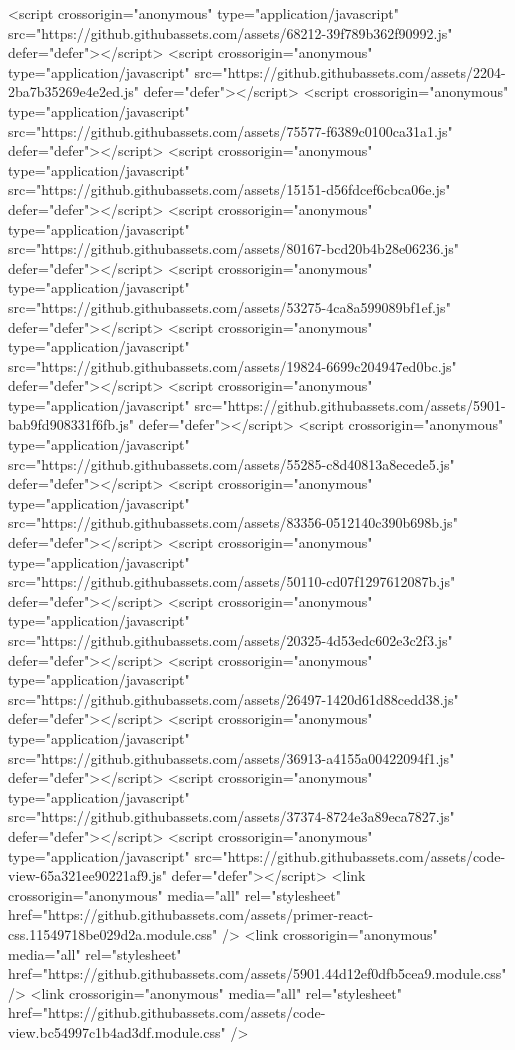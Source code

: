 <script crossorigin="anonymous" type="application/javascript" src="https://github.githubassets.com/assets/68212-39f789b362f90992.js" defer="defer"></script>
<script crossorigin="anonymous" type="application/javascript" src="https://github.githubassets.com/assets/2204-2ba7b35269e4e2ed.js" defer="defer"></script>
<script crossorigin="anonymous" type="application/javascript" src="https://github.githubassets.com/assets/75577-f6389c0100ca31a1.js" defer="defer"></script>
<script crossorigin="anonymous" type="application/javascript" src="https://github.githubassets.com/assets/15151-d56fdcef6cbca06e.js" defer="defer"></script>
<script crossorigin="anonymous" type="application/javascript" src="https://github.githubassets.com/assets/80167-bcd20b4b28e06236.js" defer="defer"></script>
<script crossorigin="anonymous" type="application/javascript" src="https://github.githubassets.com/assets/53275-4ca8a599089bf1ef.js" defer="defer"></script>
<script crossorigin="anonymous" type="application/javascript" src="https://github.githubassets.com/assets/19824-6699c204947ed0bc.js" defer="defer"></script>
<script crossorigin="anonymous" type="application/javascript" src="https://github.githubassets.com/assets/5901-bab9fd908331f6fb.js" defer="defer"></script>
<script crossorigin="anonymous" type="application/javascript" src="https://github.githubassets.com/assets/55285-c8d40813a8ecede5.js" defer="defer"></script>
<script crossorigin="anonymous" type="application/javascript" src="https://github.githubassets.com/assets/83356-0512140c390b698b.js" defer="defer"></script>
<script crossorigin="anonymous" type="application/javascript" src="https://github.githubassets.com/assets/50110-cd07f1297612087b.js" defer="defer"></script>
<script crossorigin="anonymous" type="application/javascript" src="https://github.githubassets.com/assets/20325-4d53edc602e3c2f3.js" defer="defer"></script>
<script crossorigin="anonymous" type="application/javascript" src="https://github.githubassets.com/assets/26497-1420d61d88cedd38.js" defer="defer"></script>
<script crossorigin="anonymous" type="application/javascript" src="https://github.githubassets.com/assets/36913-a4155a00422094f1.js" defer="defer"></script>
<script crossorigin="anonymous" type="application/javascript" src="https://github.githubassets.com/assets/37374-8724e3a89eca7827.js" defer="defer"></script>
<script crossorigin="anonymous" type="application/javascript" src="https://github.githubassets.com/assets/code-view-65a321ee90221af9.js" defer="defer"></script>
<link crossorigin="anonymous" media="all" rel="stylesheet" href="https://github.githubassets.com/assets/primer-react-css.11549718be029d2a.module.css" />
<link crossorigin="anonymous" media="all" rel="stylesheet" href="https://github.githubassets.com/assets/5901.44d12ef0dfb5cea9.module.css" />
<link crossorigin="anonymous" media="all" rel="stylesheet" href="https://github.githubassets.com/assets/code-view.bc54997c1b4ad3df.module.css" />

